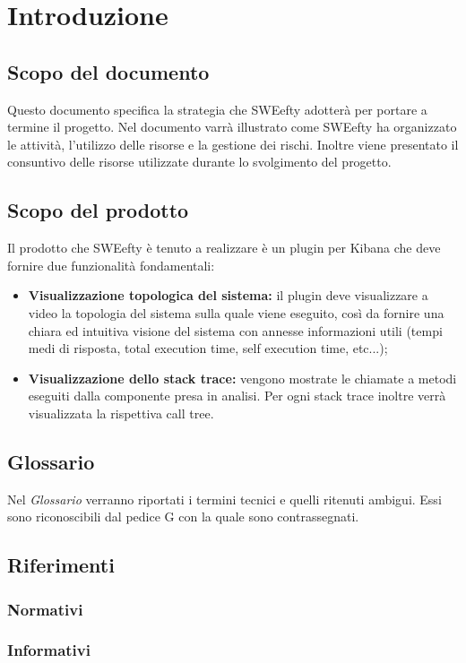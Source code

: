 \section{Introduzione}
	\subsection{Scopo del documento}
	Questo documento specifica la strategia che SWEefty adotterà per portare a termine il progetto.
	Nel documento varrà illustrato come SWEefty ha organizzato le attività, l'utilizzo delle risorse e la gestione dei rischi.
	Inoltre viene presentato il consuntivo delle risorse utilizzate durante lo svolgimento del progetto.
	
	\subsection{Scopo del prodotto}
	Il prodotto che SWEefty è tenuto a  realizzare è un plugin per Kibana che deve fornire due funzionalità fondamentali:
	\begin{itemize}
		\item \textbf{Visualizzazione topologica del sistema:} il plugin deve visualizzare a video la topologia del sistema sulla quale viene eseguito, così da fornire una chiara ed intuitiva visione del sistema con annesse informazioni utili (tempi medi di risposta, total execution time, self execution time, etc...);
		\item \textbf{Visualizzazione dello stack trace:} vengono mostrate le chiamate a metodi eseguiti dalla componente presa in analisi. Per ogni stack trace inoltre verrà visualizzata la rispettiva call tree.
	\end{itemize}

	\subsection{Glossario}
	Nel \emph{Glossario} verranno riportati i termini tecnici e quelli ritenuti ambigui. Essi sono riconoscibili dal pedice G con la quale sono contrassegnati.
	
	\subsection{Riferimenti}
			\subsubsection{Normativi}
			\subsubsection{Informativi}
